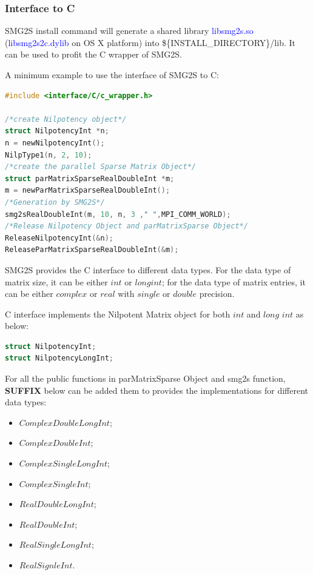 \subsubsection{Interface to C}
SMG2S install command will generate a shared library \textcolor{blue}{libsmg2s.so} (\textcolor{blue}{libsmg2s2c.dylib} on OS X platform) into \$\{INSTALL\_DIRECTORY\}/lib. It can be used to profit the C wrapper of SMG2S. 

A minimum example to use the interface of SMG2S to C:

\begin{lstlisting}[language=C,frame=single]
#include <interface/C/c_wrapper.h>

/*create Nilpotency object*/
struct NilpotencyInt *n;
n = newNilpotencyInt();
NilpType1(n, 2, 10);
/*create the parallel Sparse Matrix Object*/
struct parMatrixSparseRealDoubleInt *m;
m = newParMatrixSparseRealDoubleInt();
/*Generation by SMG2S*/
smg2sRealDoubleInt(m, 10, n, 3 ," ",MPI_COMM_WORLD);
/*Release Nilpotency Object and parMatrixSparse Object*/
ReleaseNilpotencyInt(&n);
ReleaseParMatrixSparseRealDoubleInt(&m);
\end{lstlisting}

SMG2S provides the C interface to different data types. For the data type of matrix size, it can be either $int$ or $long int$; for the data type of matrix entries, it can be either $complex$ or $real$ with $single$ or $double$ precision.

C interface implements the Nilpotent Matrix object for both $int$ and $long$ $int$ as below:
\begin{lstlisting}[language=C,frame=single,	basicstyle=\footnotesize]
struct NilpotencyInt;
struct NilpotencyLongInt;
\end{lstlisting}

For all the public functions  in parMatrixSparse Object and smg2s function, \textbf{SUFFIX} below can be added them to provides the implementations for different data types:

\begin{multicols}{2}
	\begin{itemize}
		\item $ComplexDoubleLongInt$;
		\item $ComplexDoubleInt$;
		\item $ComplexSingleLongInt$;
		\item $ComplexSingleInt$;
		\item $RealDoubleLongInt$;
		\item $RealDoubleInt$;
		\item $RealSingleLongInt$;
		\item $RealSignleInt$.
	\end{itemize}
\end{multicols}

